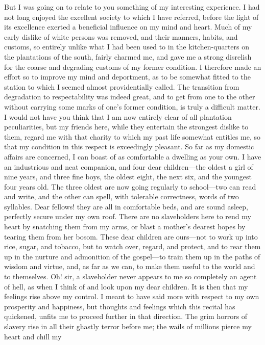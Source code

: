 But I was going on to relate to you something of my interesting
experience. I had not long enjoyed the excellent society to which I have
referred, before the light of its excellence exerted a beneficial
influence on my mind and heart. Much of my early dislike of white
persons was removed, and their manners, habits, and customs, so entirely
unlike what I had been used to in the kitchen-quarters on the
plantations of the south, fairly charmed me, and gave me a strong
disrelish for the coarse and degrading customs of my former condition. I
therefore made an effort so to improve my mind and deportment, as to be
somewhat fitted to the station to which I seemed almost providentially
called. The transition from degradation to respectability was indeed
great, and to get from one to the other without carrying some marks of
one's former condition, is truly a difficult matter. I would not have
you think that I am now entirely clear of all plantation peculiarities,
but my friends here, while they entertain the strongest dislike to them,
regard me with that charity to which my past life somewhat entitles me,
so that my condition in this respect is exceedingly pleasant. So far
{}as my domestic affairs are concerned, I can boast of as comfortable a
dwelling as your own. I have an industrious and neat companion, and four
dear children---the oldest a girl of nine years, and three fine boys,
the oldest eight, the next six, and the youngest four years old. The
three oldest are now going regularly to school---two can read and write,
and the other can spell, with tolerable correctness, words of two
syllables. Dear fellows! they are all in comfortable beds, and are sound
asleep, perfectly secure under my own roof. There are no slaveholders
here to rend my heart by snatching them from my arms, or blast a
mother's dearest hopes by tearing them from her bosom. These dear
children are ours---not to work up into rice, sugar, and tobacco, but to
watch over, regard, and protect, and to rear them up in the nurture and
admonition of the gospel---to train them up in the paths of wisdom and
virtue, and, as far as we can, to make them useful to the world and to
themselves. Oh! sir, a slaveholder never appears to me so completely an
agent of hell, as when I think of and look upon my dear children. It is
then that my feelings rise above my control. I meant to have said more
with respect to my own prosperity and happiness, but thoughts and
feelings which this recital has quickened, unfits me to proceed further
in that direction. The grim horrors of slavery rise in all their ghastly
terror before me; the wails of millions pierce my heart and chill my
